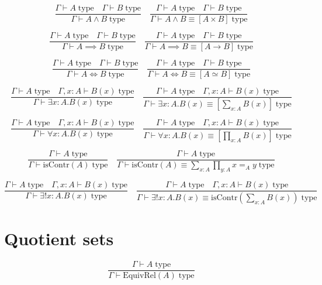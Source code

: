 \documentclass{book}
\begin{document}
$$\frac{\Gamma \vdash A \; \mathrm{type} \quad \Gamma \vdash B \; \mathrm{type}}{\Gamma \vdash A \wedge B \; \mathrm{type}} \quad \frac{\Gamma \vdash A \; \mathrm{type} \quad \Gamma \vdash B \; \mathrm{type}}{\Gamma \vdash A \wedge B \equiv [A \times B] \; \mathrm{type}}$$

$$\frac{\Gamma \vdash A \; \mathrm{type} \quad \Gamma \vdash B \; \mathrm{type}}{\Gamma \vdash A \implies B \; \mathrm{type}} \quad \frac{\Gamma \vdash A \; \mathrm{type} \quad \Gamma \vdash B \; \mathrm{type}}{\Gamma \vdash A \implies B \equiv [A \to B] \; \mathrm{type}}$$

$$\frac{\Gamma \vdash A \; \mathrm{type} \quad \Gamma \vdash B \; \mathrm{type}}{\Gamma \vdash A \iff B \; \mathrm{type}} \quad \frac{\Gamma \vdash A \; \mathrm{type} \quad \Gamma \vdash B \; \mathrm{type}}{\Gamma \vdash A \iff B \equiv [A \simeq B] \; \mathrm{type}}$$

$$\frac{\Gamma \vdash A \; \mathrm{type} \quad \Gamma, x:A \vdash B(x) \; \mathrm{type}}{\Gamma \vdash \exists x:A.B(x) \; \mathrm{type}} \quad \frac{\Gamma \vdash A \; \mathrm{type} \quad \Gamma, x:A \vdash B(x) \; \mathrm{type}}{\Gamma \vdash \exists x:A.B(x) \equiv \left[\sum_{x:A} B(x)\right] \; \mathrm{type}}$$

$$\frac{\Gamma \vdash A \; \mathrm{type} \quad \Gamma, x:A \vdash B(x) \; \mathrm{type}}{\Gamma \vdash \forall x:A.B(x) \; \mathrm{type}} \quad \frac{\Gamma \vdash A \; \mathrm{type} \quad \Gamma, x:A \vdash B(x) \; \mathrm{type}}{\Gamma \vdash \forall x:A.B(x) \equiv \left[\prod_{x:A} B(x)\right] \; \mathrm{type}}$$

$$\frac{\Gamma \vdash A \; \mathrm{type}}{\Gamma \vdash \mathrm{isContr}(A) \; \mathrm{type}} \quad \frac{\Gamma \vdash A \; \mathrm{type}}{\Gamma \vdash \mathrm{isContr}(A) \equiv \sum_{x:A} \prod_{y:A} x =_A y \; \mathrm{type}}$$

$$\frac{\Gamma \vdash A \; \mathrm{type} \quad \Gamma, x:A \vdash B(x) \; \mathrm{type}}{\Gamma \vdash \exists!x:A.B(x) \; \mathrm{type}} \quad \frac{\Gamma \vdash A \; \mathrm{type} \quad \Gamma, x:A \vdash B(x) \; \mathrm{type}}{\Gamma \vdash \exists!x:A.B(x) \equiv \mathrm{isContr}\left(\sum_{x:A} B(x)\right) \; \mathrm{type}}$$

\section{Quotient sets}

$$\frac{\Gamma \vdash A \; \mathrm{type}}{\Gamma \vdash \mathrm{EquivRel}(A) \; \mathrm{type}}$$ 
\end{document}
